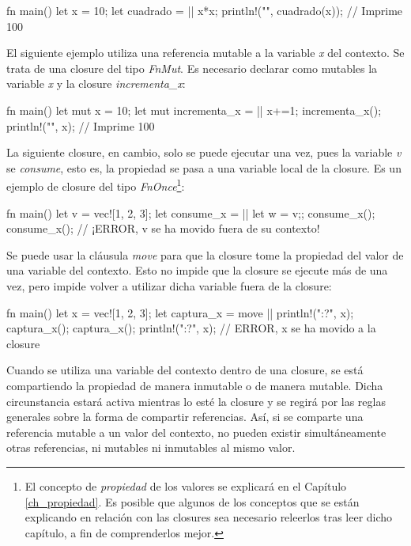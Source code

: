 \vspace{0.7em}
\begin{Codigo}
fn main() {
   let x = 10;
   let cuadrado = || {x*x};
   println!("{}", cuadrado(x)); // Imprime 100
}
\end{Codigo}

El siguiente ejemplo utiliza una referencia mutable a la variable \textit{x} del contexto. Se trata de una closure del tipo \textit{FnMut}. Es necesario declarar como mutables la variable \textit{x} y la closure \textit{incrementa\_x}:

\vspace{0.7em}
\begin{Codigo}
fn main() {
   let mut x = 10;
   let mut incrementa_x = || x+=1;
   incrementa_x();
   println!("{}", x); // Imprime 100
}
\end{Codigo}

La siguiente closure, en cambio, solo se puede ejecutar una vez, pues la variable \textit{v} se \textit{consume}, esto es, la propiedad se pasa a una variable local de la closure. Es un ejemplo de closure del tipo \textit{FnOnce}\footnote{El concepto de \textit{propiedad} de los valores se explicará en el Capítulo \ref{ch_propiedad}. Es posible que algunos de los conceptos que se están explicando en relación con las closures sea necesario releerlos tras leer dicho capítulo, a fin de comprenderlos mejor.}:

\vspace{0.7em}
\begin{Codigo}
fn main() {
   let v = vec![1, 2, 3];
   let consume_x =  || {let w = v;};
   consume_x();
   consume_x(); // ¡ERROR, v se ha movido fuera de su contexto!
}
\end{Codigo}

Se puede usar la cláusula \textit{move} para que la closure tome la propiedad del valor de una variable del contexto. Esto no impide que la closure se ejecute más de una vez, pero impide volver a utilizar dicha variable fuera de la closure:

\vspace{0.7em}
\begin{Codigo}
fn main() {
   let x = vec![1, 2, 3];
   let captura_x =  move || println!("{:?}", x);
   captura_x();
   captura_x();
   println!("{:?}", x); // ERROR, x se ha movido a la closure 
}
\end{Codigo}

Cuando se utiliza una variable del contexto dentro de una closure, se está compartiendo la propiedad de manera inmutable o de manera mutable. Dicha circunstancia estará activa mientras lo esté la closure y se regirá por las reglas generales sobre la forma de compartir referencias. Así, si se comparte una referencia mutable a un valor del contexto, no pueden existir simultáneamente otras referencias, ni mutables ni inmutables al mismo valor. 

